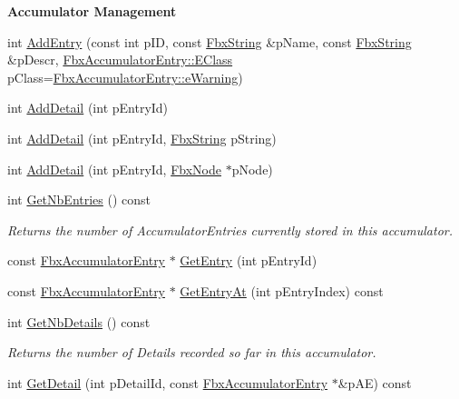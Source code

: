\begin{Indent}\textbf{ Accumulator Management}\par
\begin{DoxyCompactItemize}
\item 
int \hyperlink{class_fbx_user_notification_afc393d96ae3c3d826f3947507dcaa656}{Add\+Entry} (const int p\+ID, const \hyperlink{class_fbx_string}{Fbx\+String} \&p\+Name, const \hyperlink{class_fbx_string}{Fbx\+String} \&p\+Descr, \hyperlink{class_fbx_accumulator_entry_af08af3ddcbf7e8fe642d7e9ecb4ad0e2}{Fbx\+Accumulator\+Entry\+::\+E\+Class} p\+Class=\hyperlink{class_fbx_accumulator_entry_af08af3ddcbf7e8fe642d7e9ecb4ad0e2a02238ae4f2cce7a190dad59cfb3e9c19}{Fbx\+Accumulator\+Entry\+::e\+Warning})
\item 
int \hyperlink{class_fbx_user_notification_a612d9fbba6d767dcd4614e4f4934298a}{Add\+Detail} (int p\+Entry\+Id)
\item 
int \hyperlink{class_fbx_user_notification_a3b675ae36a5f91c34f80edd417e1bec9}{Add\+Detail} (int p\+Entry\+Id, \hyperlink{class_fbx_string}{Fbx\+String} p\+String)
\item 
int \hyperlink{class_fbx_user_notification_a7e15dc53d4431dcc1411d9ae05498349}{Add\+Detail} (int p\+Entry\+Id, \hyperlink{class_fbx_node}{Fbx\+Node} $\ast$p\+Node)
\item 
int \hyperlink{class_fbx_user_notification_af952064b707c1a6165590e83497940af}{Get\+Nb\+Entries} () const
\begin{DoxyCompactList}\small\item\em Returns the number of Accumulator\+Entries currently stored in this accumulator. \end{DoxyCompactList}\item 
const \hyperlink{class_fbx_accumulator_entry}{Fbx\+Accumulator\+Entry} $\ast$ \hyperlink{class_fbx_user_notification_afde8bbb200efe632e2df0a81413f4476}{Get\+Entry} (int p\+Entry\+Id)
\item 
const \hyperlink{class_fbx_accumulator_entry}{Fbx\+Accumulator\+Entry} $\ast$ \hyperlink{class_fbx_user_notification_a78fc0966bfef1ea2a17f7a4ccd4a7318}{Get\+Entry\+At} (int p\+Entry\+Index) const
\item 
int \hyperlink{class_fbx_user_notification_a1c5bdc6db66e58957abec1cc7d5349a2}{Get\+Nb\+Details} () const
\begin{DoxyCompactList}\small\item\em Returns the number of Details recorded so far in this accumulator. \end{DoxyCompactList}\item 
int \hyperlink{class_fbx_user_notification_ae006edb0dda9a27ef1773494d254906e}{Get\+Detail} (int p\+Detail\+Id, const \hyperlink{class_fbx_accumulator_entry}{Fbx\+Accumulator\+Entry} $\ast$\&p\+AE) const
\end{DoxyCompactItemize}
\end{Indent}
